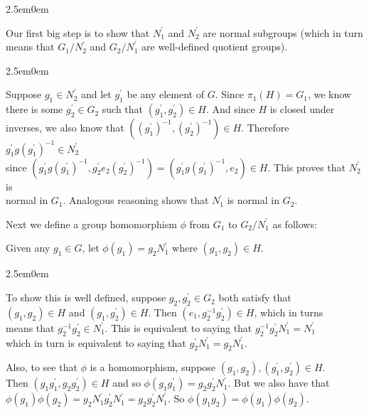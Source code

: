 \documentclass{book}
\newcommand{\HexTwoP}{%
   \color{RedViolet}%
   \fontsize{12}{13}\selectfont%
}
\newenvironment{myIndent}{%
   \begin{adjustwidth}{2.5em}{0em}%
}{%
   \end{adjustwidth}%
}
\newcommand{\retTwo}{\hfill\bigbreak}
\begin{document}
\begin{enumerate}
\begin{myIndent}
		Our first big step is to show that $N_1^\prime$ and $N_2^\prime$ are normal subgroups (which in turn means that $G_1/N_2^\prime$ and $G_2/N_1^\prime$ are well-defined quotient groups).
		\begin{myIndent}\HexTwoP
			Suppose $g_1 \in N_2^\prime$ and let $g^\prime_1$ be any element of $G$. Since $\pi_1(H) = G_1$, we know\\ [2pt] there is some $g^\prime_2 \in G_2$ such that $(g^\prime_1, g^\prime_2) \in H$. And since $H$ is closed under\\ [2pt] inverses, we also know that $((g_1^\prime)^{-1}, (g_2^\prime)^{-1}) \in H$. Therefore $g^\prime_1 g (g^\prime_1)^{-1} \in N_2^\prime$\\ [2pt] since $(g^\prime_1 g (g^\prime_1)^{-1},  g^\prime_2 e_2 (g^\prime_2)^{-1}) = (g^\prime_1 g (g^\prime_1)^{-1}, e_2) \in H$. This proves that $N_2^\prime$ is\\ [2pt] normal in $G_1$. Analogous reasoning shows that $N_1^\prime$ is normal in $G_2$.\retTwo
		\end{myIndent}

		Next we define a group homomorphism $\phi$ from $G_1$ to $G_2/N_1^\prime$ as follows:

		{\centering Given any $g_1 \in G$, let $\phi(g_1) = g_2N_1^\prime$ where $(g_1, g_2) \in H$.   \retTwo\par}

		\begin{myIndent}\HexTwoP
			To show this is well defined, suppose $g_2, g_2^\prime \in G_2$ both satisfy that\\ [1pt] $(g_1, g_2) \in H$ and $(g_1, g_2^\prime) \in H$. Then $(e_1, g_2^{-1}g_2^\prime) \in H$, which in turns\\ [1pt] means that $g_2^{-1}g_2^\prime \in N_1^\prime$. This is equivalent to saying that $g_2^{-1} g_2^\prime N_1^\prime = N_1^\prime$\\ which in turn is equivalent to saying that $g_2^\prime N_1^\prime = g_2 N_1^\prime$.\retTwo

			Also, to see that $\phi$ is a homomorphism, suppose $(g_1, g_2), (g_1^\prime, g_2^\prime) \in H$.\\ [1pt] Then $(g_1g_1^\prime, g_2g_2^\prime) \in H$ and so $\phi(g_1g_1^\prime) = g_2g_2^\prime N_1^\prime$. But we also have that\\ [1pt] $\phi(g_1)\phi(g_2) = g_2N_1^\prime g_2^\prime N_1^\prime = g_2g_2^\prime N_1^\prime$. So $\phi(g_1g_2) = \phi(g_1)\phi(g_2)$.\retTwo
		\end{myIndent}


\end{myIndent}
\end{enumerate}
\end{document}
